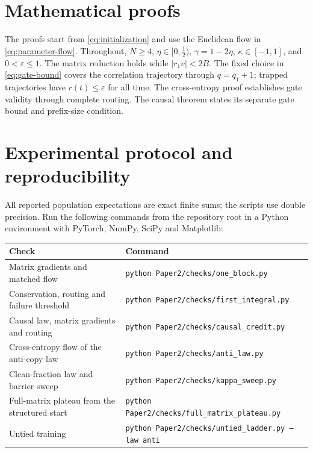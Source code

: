 \section{Mathematical proofs}
\label{app:proofs}
The proofs start from \cref{eq:initialization} and use the Euclidean flow in \cref{eq:parameter-flow}.
Throughout, $N\ge4$, $\eta\in[0,\tfrac{1}{2})$, $\gamma=1-2\eta$, $\kappa\in[-1,1]$, and $0<\varepsilon\le1$.
The matrix reduction holds while $|r_1v|<2B$.
The fixed choice in \cref{eq:gate-bound} covers the correlation trajectory through $q=q_1+1$;
trapped trajectories have $r(t)\le \varepsilon$ for all time.
The cross-entropy proof establishes gate validity through complete routing. The causal theorem states its separate gate bound and prefix-size condition.









\section{Experimental protocol and reproducibility}
\label{app:numerics}
\label{app:repro}
\label{app:network-experiments}
All reported population expectations are exact finite sums; the scripts use double precision.
Run the following commands from the repository root in a Python environment with PyTorch, NumPy, SciPy and Matplotlib:
\begin{center}
\small
\begin{tabular}{@{}ll@{}}
\toprule
Check & Command\\
\midrule
Matrix gradients and matched flow & \texttt{python Paper2/checks/one\_block.py}\\
Conservation, routing and failure threshold & \texttt{python Paper2/checks/first\_integral.py}\\
Causal law, matrix gradients and routing & \texttt{python Paper2/checks/causal\_credit.py}\\
Cross-entropy flow of the anti-copy law & \texttt{python Paper2/checks/anti\_law.py}\\
Clean-fraction law and barrier sweep & \texttt{python Paper2/checks/kappa\_sweep.py}\\
Full-matrix plateau from the structured start & \texttt{python Paper2/checks/full\_matrix\_plateau.py}\\
Untied training & \texttt{python Paper2/checks/untied\_ladder.py --law anti}\\
\bottomrule
\end{tabular}
\end{center}

